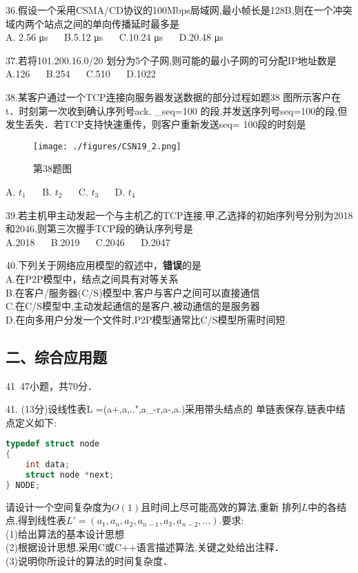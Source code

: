 36.假设一个采用CSMA/CD协议的100Mbps局域网,最小帧长是128B,则在一个冲突域内两个站点之间的单向传播延时最多是 \\
A. 2.56 μs $\quad$ B.5.12 μs $\quad$ C.10.24 μs
$\quad$ D.20.48 μs

37.若将101.200.16.0/20 划分为5个子网,则可能的最小子网的可分配IP地址数是 \\
A.126 $\quad$ B.254 $\quad$ C.510 $\quad$ D.1022

38.某客户通过一个TCP连接向服务器发送数据的部分过程如题38
图所示客户在t．时刻第一次收到确认序列号ack. _seq=100 的段,并发送序列号seq=100的段,但发生丢失．若TCP支持快速重传，则客户重新发送seq= 100段的时刻是 \\
\begin{figure}[ht]
\centering
\texttt{[image: ./figures/CSN19\_2.png]}
\caption{第38题图} \label{CSN19_fig2}
\end{figure}
A. $t_1$ $\quad$ B. $t_2$ $\quad$ C. $t_3$ $\quad$ D. $t_4$

39.若主机甲主动发起一个与主机乙的TCP连接,甲,乙选择的初始序列号分别为2018和2046,则第三次握手TCP段的确认序列号是 \\
A.2018 $\quad$ B.2019 $\quad$ C.2046 $\quad$ D.2047

40.下列关于网络应用模型的叙述中，\textbf{错误}的是 \\
A.在P2P模型中，结点之间具有对等关系 \\
B.在客户/服务器(C/S)模型中,客户与客户之间可以直接通信 \\
C.在C/S模型中,主动发起通信的是客户,被动通信的是服务器 \\
D.在向多用户分发一个文件时,P2P模型通常比C/S模型所需时间短.

\subsection{二、综合应用题}
41~47小题，共70分．

41. (13分)设线性表L =(a+,a,..",a_-r,a-,a.)采用带头结点的
单链表保存,链表中结点定义如下:
\begin{lstlisting}[language=cpp]
typedef struct node
{
    int data;
    struct node *next;
} NODE;
\end{lstlisting}
请设计一个空间复杂度为$O(1)$且时间上尽可能高效的算法,重新
排列$L$中的各结点,得到线性表$L'=(a_1,a_n,a_2,a_{n-1},a_3,a_{n-2},...)$.要求: \\
(1)给出算法的基本设计思想 \\
(2)根据设计思想,采用C或C++语言描述算法,关键之处给出注释． \\
(3)说明你所设计的算法的时间复杂度．


